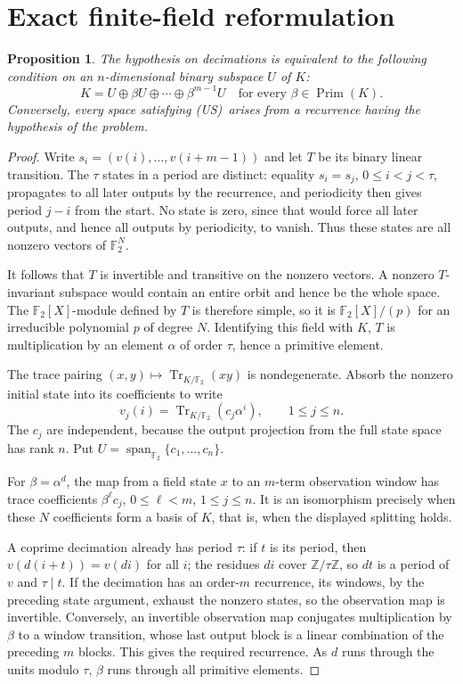 \documentclass[11pt,a4paper]{article}
\newtheorem{proposition}[theorem]{Proposition}
\theoremstyle{definition}\newtheorem{definition}[theorem]{Definition}
\theoremstyle{remark}\newtheorem{remark}[theorem]{Remark}
\newcommand{\F}{\mathbb F}
\newcommand{\Tr}{\operatorname{Tr}}
\newcommand{\Prim}{\operatorname{Prim}}
\newcommand{\Span}{\operatorname{span}}
\newcommand{\US}{\textup{(US)}}
\numberwithin{equation}{section}
\begin{document}
\section{Exact finite-field reformulation}\label{sec:reform}
\begin{proposition}\label{prop:reform}
The hypothesis on decimations is equivalent to the following condition on an $n$-dimensional binary subspace $U$ of $K$:
\begin{equation}\tag{US}\label{eq:US}
K=U\oplus\beta U\oplus\cdots\oplus\beta^{m-1}U
\quad\text{for every }\beta\in\Prim(K).
\end{equation}
Conversely, every space satisfying \US\ arises from a recurrence having the hypothesis of the problem.
\end{proposition}
\begin{proof}
Write $s_i=(v(i),\ldots,v(i+m-1))$ and let $T$ be its binary linear transition. The $\tau$ states in a period are distinct: equality $s_i=s_j$, $0\le i<j<\tau$, propagates to all later outputs by the recurrence, and periodicity then gives period $j-i$ from the start. No state is zero, since that would force all later outputs, and hence all outputs by periodicity, to vanish. Thus these states are all nonzero vectors of $\F_2^N$.

It follows that $T$ is invertible and transitive on the nonzero vectors. A nonzero $T$-invariant subspace would contain an entire orbit and hence be the whole space. The $\F_2[X]$-module defined by $T$ is therefore simple, so it is $\F_2[X]/(p)$ for an irreducible polynomial $p$ of degree $N$. Identifying this field with $K$, $T$ is multiplication by an element $\alpha$ of order $\tau$, hence a primitive element.

The trace pairing $(x,y)\mapsto\Tr_{K/\F_2}(xy)$ is nondegenerate. Absorb the nonzero initial state into its coefficients to write
\[
v_j(i)=\Tr_{K/\F_2}(c_j\alpha^i),\qquad 1\le j\le n.
\]
The $c_j$ are independent, because the output projection from the full state space has rank $n$. Put $U=\Span_{\F_2}\{c_1,\ldots,c_n\}$.

For $\beta=\alpha^d$, the map from a field state $x$ to an $m$-term observation window has trace coefficients $\beta^\ell c_j$, $0\le\ell<m$, $1\le j\le n$. It is an isomorphism precisely when these $N$ coefficients form a basis of $K$, that is, when the displayed splitting holds.

A coprime decimation already has period $\tau$: if $t$ is its period, then $v(d(i+t))=v(di)$ for all $i$; the residues $di$ cover $\mathbb Z/\tau\mathbb Z$, so $dt$ is a period of $v$ and $\tau\mid t$. If the decimation has an order-$m$ recurrence, its windows, by the preceding state argument, exhaust the nonzero states, so the observation map is invertible. Conversely, an invertible observation map conjugates multiplication by $\beta$ to a window transition, whose last output block is a linear combination of the preceding $m$ blocks. This gives the required recurrence. As $d$ runs through the units modulo $\tau$, $\beta$ runs through all primitive elements.


\end{proof}
\end{document}
